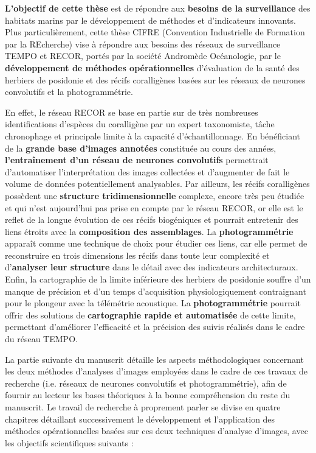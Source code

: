 \textbf{L’objectif de cette thèse} est de répondre aux \textbf{besoins de la surveillance} des habitats marins par le développement de méthodes et d’indicateurs innovants. Plus particulièrement, cette thèse CIFRE (Convention Industrielle de Formation par la REcherche) vise à répondre aux besoins des réseaux de surveillance TEMPO et RECOR, portés par la société Andromède Océanologie, par le \textbf{développement de méthodes opérationnelles} d’évaluation de la santé des herbiers de posidonie et des récifs coralligènes basées sur les réseaux de neurones convolutifs et la photogrammétrie. 

En effet, le réseau RECOR se base en partie sur de très nombreuses identifications d’espèces du coralligène par un expert taxonomiste, tâche chronophage et principale limite à la capacité d’échantillonnage. En bénéficiant de la \textbf{grande base d’images annotées} constituée au cours des années, \textbf{l’entraînement d’un réseau de neurones convolutifs} permettrait d’automatiser l’interprétation des images collectées et d’augmenter de fait le volume de données potentiellement analysables. Par ailleurs, les récifs coralligènes possèdent une \textbf{structure tridimensionnelle} complexe, encore très peu étudiée et qui n’est aujourd’hui pas prise en compte par le réseau RECOR, or elle est le reflet de la longue évolution de ces récifs biogéniques et pourrait entretenir des liens étroits avec la \textbf{composition des assemblages}. La \textbf{photogrammétrie} apparaît comme une technique de choix pour étudier ces liens, car elle permet de reconstruire en trois dimensions les récifs dans toute leur complexité et d’\textbf{analyser leur structure} dans le détail avec des indicateurs architecturaux. Enfin, la cartographie de la limite inférieure des herbiers de posidonie souffre d’un manque de précision et d’un temps d’acquisition physiologiquement contraignant pour le plongeur avec la télémétrie acoustique. La \textbf{photogrammétrie} pourrait offrir des solutions de \textbf{cartographie rapide et automatisée} de cette limite, permettant d’améliorer l’efficacité et la précision des suivis réalisés dans le cadre du réseau TEMPO. 

La partie suivante du manuscrit détaille les aspects méthodologiques concernant les deux méthodes d’analyses d’images employées dans le cadre de ces travaux de recherche (i.e. réseaux de neurones convolutifs et photogrammétrie), afin de fournir au lecteur les bases théoriques à la bonne compréhension du reste du manuscrit. Le travail de recherche à proprement parler se divise en quatre chapitres détaillant successivement le développement et l’application des méthodes opérationnelles basées sur ces deux techniques d’analyse d’images, avec les objectifs scientifiques suivants :

